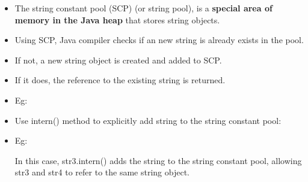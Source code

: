 \setlength{\columnsep}{3pt}
\begin{flushleft}
	
	\begin{itemize}
		\item The string constant pool (SCP) (or string pool), is a \textbf{special area of memory in the Java heap} that stores string objects. 
		\item Using SCP, Java compiler checks if an new string is already exists in the pool. 
		\item If not, a new string object is created and added to SCP.
		\item If it does, the reference to the existing string is returned. 
		\item Eg:
		\bigskip
	
		
		\newpage
		
		\item Use intern() method to explicitly add string to the string constant pool:
		\item Eg:
		\bigskip
	
		\bigskip
		In this case, str3.intern() adds the string to the string constant pool, allowing str3 and str4 to refer to the same string object.
	
		\bigskip
	
	\end{itemize}
	
\end{flushleft}
\newpage
